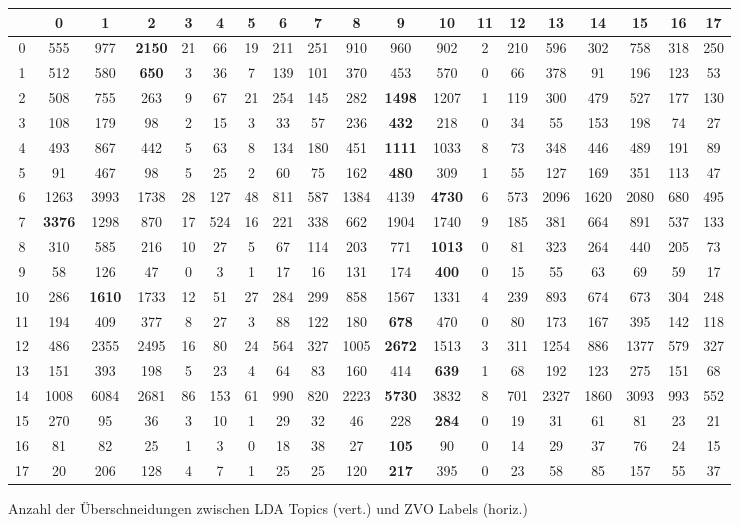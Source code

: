 \documentclass[german,version-2020-11]{uzl-thesis}
\begin{document}
\begin{enumerate}
\begin{figure}[h]
\begin{center}
\tiny
\renewcommand{\arraystretch}{2}
\begin{tabular}{ccccccccccccccccccc}
\hline
\hline 
&0&1&2&3&4&5&6&7&8&9&10&11&12&13&14&15&16&17\\
\hline
\hline
0&555& 977& \textbf{2150}& 21& 66& 19& 211& 251& 910& 960& 902& 2& 210& 596& 302& 758& 318& 250\\
\hline 
1&512& 580& \textbf{650}& 3& 36& 7& 139& 101& 370& 453& 570& 0& 66& 378& 91& 196& 123& 53\\
\hline 
2&508& 755& 263& 9& 67& 21& 254& 145& 282& \textbf{1498}& 1207& 1& 119& 300& 479& 527& 177& 130\\
\hline 
3&108& 179& 98& 2& 15& 3& 33& 57& 236& \textbf{432}& 218& 0& 34& 55& 153& 198& 74& 27\\
\hline 
4&493& 867& 442& 5& 63& 8& 134& 180& 451& \textbf{1111}& 1033& 8& 73& 348& 446& 489& 191& 89\\
\hline 
5&91& 467& 98& 5& 25& 2& 60& 75& 162& \textbf{480}& 309& 1& 55& 127& 169& 351& 113& 47\\
\hline 
6&1263& 3993& 1738& 28& 127& 48& 811& 587& 1384& 4139& \textbf{4730}& 6& 573& 2096& 1620& 2080& 680& 495\\
\hline 
7&\textbf{3376}& 1298& 870& 17& 524& 16& 221& 338& 662& 1904& 1740& 9& 185& 381& 664& 891& 537& 133\\
\hline 
8&310& 585& 216& 10& 27& 5& 67& 114& 203& 771 & \textbf{1013}& 0& 81& 323& 264& 440& 205& 73\\
\hline 
9&58& 126& 47& 0& 3& 1& 17& 16& 131& 174& \textbf{400}& 0& 15& 55& 63& 69& 59& 17\\
\hline 
10&286& \textbf{1610}& 1733& 12& 51& 27& 284& 299& 858& 1567& 1331& 4& 239& 893& 674& 673& 304& 248\\
\hline 
11&194& 409& 377& 8& 27& 3& 88& 122& 180& \textbf{678}& 470& 0& 80& 173& 167& 395& 142& 118\\
\hline 
12&486& 2355& 2495& 16& 80& 24& 564& 327& 1005& \textbf{2672}& 1513& 3& 311& 1254& 886& 1377& 579& 327\\
\hline 
13&151& 393& 198& 5& 23& 4& 64& 83& 160& 414& \textbf{639}& 1& 68& 192& 123& 275& 151& 68\\
\hline 
14&1008& 6084& 2681& 86& 153& 61& 990& 820& 2223& \textbf{5730}& 3832& 8& 701& 2327& 1860& 3093& 993& 552\\
\hline 
15&270& 95& 36& 3& 10& 1& 29& 32& 46& 228& \textbf{284}& 0& 19& 31& 61& 81& 23& 21\\
\hline 
16&81& 82& 25& 1& 3& 0& 18& 38& 27& \textbf{105}& 90& 0& 14& 29& 37& 76& 24& 15\\
\hline
17&20& 206& 128& 4& 7& 1& 25& 25& 120& \textbf{217}& 395& 0& 23& 58& 85& 157& 55& 37\\
\hline
\hline
\end{tabular}
\caption{Anzahl der Überschneidungen zwischen LDA Topics (vert.) und ZVO Labels (horiz.)}
\end{center}
\end{figure}\\



\end{enumerate}
\end{document}
